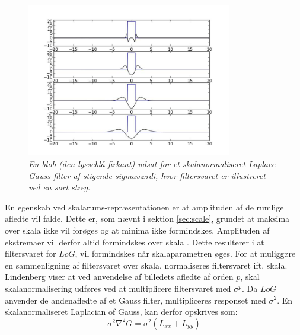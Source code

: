 \begin{figure}[H]
    \centering
    \includegraphics[width=0.80\textwidth]{fig/42.jpg}
    \vspace{-0.75em}
    \begin{center}
    \caption{{\footnotesize \textit{En blob (den lysseblå firkant) udsat for et skalanormaliseret Laplace Gauss filter af stigende sigmaværdi, hvor filtersvaret er illustreret ved en sort streg.
}}}
    \label{fig:laprespons}
     \end{center}
  \end{figure}
       \vspace{-2.7em}
\noindent
En egenskab ved skalarums-repræsentationen er at amplituden af de rumlige afledte vil falde. Dette er, som nævnt i sektion \ref{sec:scale}, grundet at maksima over skala ikke vil forøges og at minima ikke formindskes. Amplituden af ekstremaer vil derfor altid formindskes over skala \cite{phdlind}. Dette resulterer i at filtersvaret for $LoG$, vil formindskes når skalaparametren øges. For at muliggøre en sammenligning af filtersvaret over skala, normaliseres filtersvaret ift. skala.  Lindenberg \cite{lindenscale} viser at ved anvendelse af billedets afledte af orden $p$, skal skalanormalisering udføres ved at multiplicere filtersvaret med $\sigma^p$. Da $LoG$ anvender de andenafledte af et Gauss filter, multipliceres responset med $\sigma^2$. En skalanormaliseret Laplacian of Gauss, kan derfor opskrives som:
\begin{equation}
\sigma^2 \nabla^2G = \sigma^2(L_{xx}+L_{yy})
\end{equation}